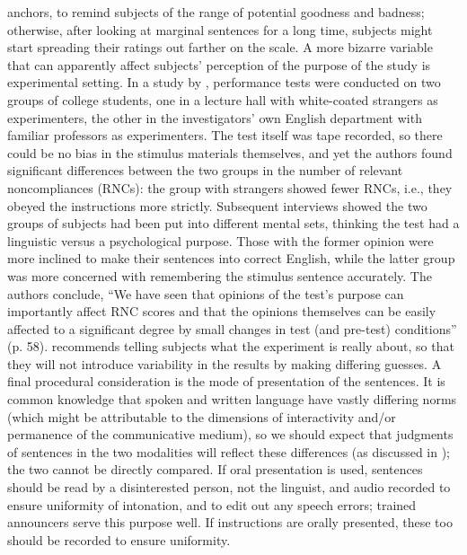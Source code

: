 anchors, to remind subjects of the range of potential goodness and badness; otherwise, after looking at marginal sentences for a long time, subjects might start spreading their ratings out farther on the scale. A more bizarre variable that can apparently affect subjects' perception of the purpose of the study is experimental setting. In a study by \citet{GreenbaumEtAl1970}, performance tests were conducted on two groups of college students, one in a lecture hall with white-coated strangers as experimenters, the other in the investigators' own English department with familiar professors as experimenters. The test itself was tape recorded, so there could be no bias in the stimulus materials themselves, and yet the authors found significant differences between the two groups in the number of relevant noncompliances (RNCs): the group with strangers showed fewer RNCs, i.e., they obeyed the instructions more strictly. Subsequent interviews showed the two groups of subjects had been put into different mental sets, thinking the test had a linguistic versus a psychological purpose. Those with the former opinion were more inclined to make their sentences into correct English, while the latter group was more concerned with remembering the stimulus sentence accurately. The authors conclude, ``We have seen that opinions of the test's purpose can importantly affect RNC scores and that the opinions themselves can be easily affected to a significant degree by small changes in test (and pre-test) conditions'' (p. 58). \citet{Greenbaum1977c} recommends telling subjects what the experiment is really about, so that they will not introduce variability in the results by making differing guesses. A final procedural consideration is the mode of presentation of the sentences. It is common knowledge that spoken and written language have vastly differing norms (which might be attributable to the dimensions of interactivity and/or permanence of the communicative medium), so we should expect that judgments of sentences in the two modalities will reflect these differences (as discussed in ); the two cannot be directly compared. If oral presentation is used, sentences should be read by a disinterested person, not the linguist, and audio recorded to ensure uniformity of intonation, and to edit out any speech errors; trained announcers serve this purpose well. If instructions are orally presented, these too should be recorded to ensure uniformity.

